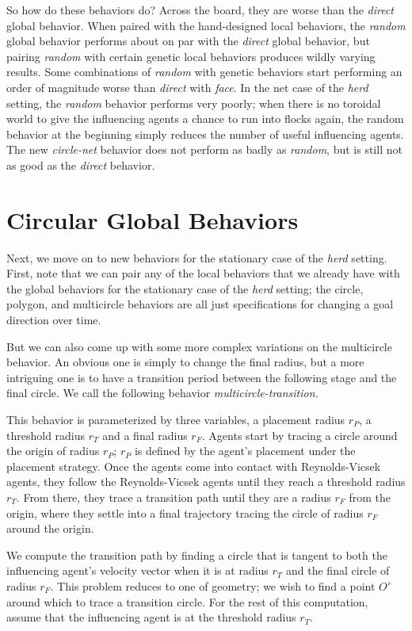 So how do these behaviors do?
Across the board, they are worse than the \textit{direct} global behavior.
When paired with the hand-designed local behaviors, the \textit{random} global
behavior performs about on par with the \textit{direct} global behavior, but
pairing \textit{random} with certain genetic local behaviors produces wildly
varying results.
Some combinations of \textit{random} with genetic behaviors start performing
an order of magnitude worse than \textit{direct} with \textit{face}.
In the net case of the \textit{herd} setting, the \textit{random} behavior
performs very poorly; when there is no toroidal world to give the influencing
agents a chance to run into flocks again, the random behavior at the beginning
simply reduces the number of useful influencing agents.
The new \textit{circle-net} behavior does not perform as badly as
\textit{random}, but is still not as good as the \textit{direct} behavior.

\section{Circular Global Behaviors}
Next, we move on to new behaviors for the stationary case of the \textit{herd}
setting.
First, note that we can pair any of the local behaviors that we already have
with the global behaviors for the stationary case of the \textit{herd} setting;
the circle, polygon, and multicircle behaviors are all just specifications for
changing a goal direction over time.

But we can also come up with some more complex variations on the multicircle
behavior.
An obvious one is simply to change the final radius, but a more intriguing
one is to have a transition period between the following stage and the final
circle.
We call the following behavior \textit{multicircle-transition.}

This behavior is parameterized by three variables, a placement radius $r_P$, a
threshold radius $r_T$ and a final radius $r_F$.
Agents start by tracing a circle around the origin of radius $r_P$; $r_P$ is
defined by the agent's placement under the placement strategy.
Once the agents come into contact with Reynolds-Vicsek agents, they follow the
Reynolds-Vicsek agents until they reach a threshold radius $r_T$.
From there, they trace a transition path until they are a radius $r_F$ from the
origin, where they settle into a final trajectory tracing the circle of radius
$r_F$ around the origin.

We compute the transition path by finding a circle that is tangent to both the
influencing agent's velocity vector when it is at radius $r_T$ and the final
circle of radius $r_F$.
This problem reduces to one of geometry; we wish to find a point $O'$ around
which to trace a transition circle.
For the rest of this computation, assume that the influencing agent is at the
threshold radius $r_T$.

